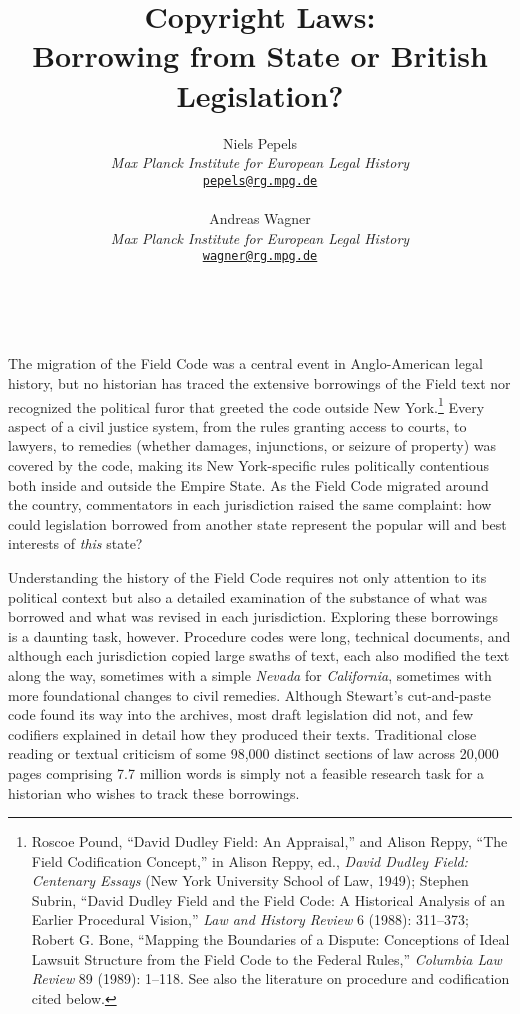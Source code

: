\documentclass[12pt,]{article}
\title{Copyright Laws:\\
Borrowing from State or British Legislation?}
\author{  \normalsize Niels Pepels \\ \small \emph{Max Planck Institute for European Legal History} \\ \small \href{mailto:pepels@rg.mpg.de}{\nolinkurl{pepels@rg.mpg.de}}  \\ \\   \normalsize Andreas Wagner \\ \small \emph{Max Planck Institute for European Legal History} \\ \small \href{mailto:wagner@rg.mpg.de}{\nolinkurl{wagner@rg.mpg.de}} }
\date{}
\let\rmarkdownfootnote\footnote%
\def\footnote{\protect\rmarkdownfootnote}
\begin{document}
\maketitle

~

The migration of the Field Code was a central event in Anglo-American
legal history, but no historian has traced the extensive borrowings of
the Field text nor recognized the political furor that greeted the code
outside New York.\footnote{Roscoe Pound, ``David Dudley Field: An
  Appraisal,'' and Alison Reppy, ``The Field Codification Concept,'' in
  Alison Reppy, ed., \emph{David Dudley Field: Centenary Essays} (New
  York University School of Law, 1949); Stephen Subrin, ``David Dudley
  Field and the Field Code: A Historical Analysis of an Earlier
  Procedural Vision,'' \emph{Law and History Review} 6 (1988): 311--373;
  Robert G. Bone, ``Mapping the Boundaries of a Dispute: Conceptions of
  Ideal Lawsuit Structure from the Field Code to the Federal Rules,''
  \emph{Columbia Law Review} 89 (1989): 1--118. See also the literature
  on procedure and codification cited below.} Every aspect of a civil
justice system, from the rules granting access to courts, to lawyers, to
remedies (whether damages, injunctions, or seizure of property) was
covered by the code, making its New York-specific rules politically
contentious both inside and outside the Empire State. As the Field Code
migrated around the country, commentators in each jurisdiction raised
the same complaint: how could legislation borrowed from another state
represent the popular will and best interests of \emph{this} state?

Understanding the history of the Field Code requires not only attention
to its political context but also a detailed examination of the
substance of what was borrowed and what was revised in each
jurisdiction. Exploring these borrowings is a daunting task, however.
Procedure codes were long, technical documents, and although each
jurisdiction copied large swaths of text, each also modified the text
along the way, sometimes with a simple \emph{Nevada} for
\emph{California}, sometimes with more foundational changes to civil
remedies. Although Stewart's cut-and-paste code found its way into the
archives, most draft legislation did not, and few codifiers explained in
detail how they produced their texts. Traditional close reading or
textual criticism of some 98,000 distinct sections of law across 20,000
pages comprising 7.7 million words is simply not a feasible research
task for a historian who wishes to track these borrowings.
\end{document}
